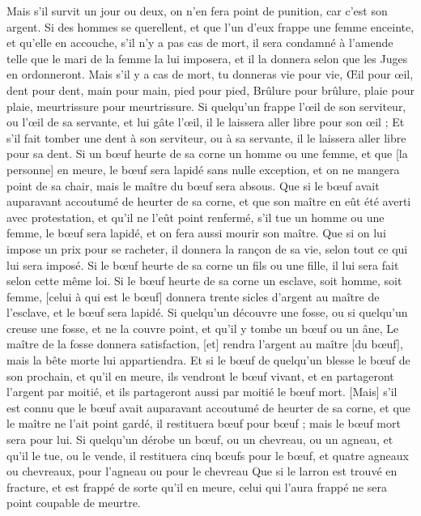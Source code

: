 \begin{multicols}{2}
Mais s'il survit un jour ou deux, on n'en fera point de punition, car c'est son argent.
Si des hommes se querellent, et que l'un d'eux frappe une femme enceinte, et qu'elle en accouche, s'il n'y a pas cas de mort, il sera condamné à l'amende telle que le mari de la femme la lui imposera, et il la donnera selon que les Juges en ordonneront.
Mais s'il y a cas de mort, tu donneras vie pour vie,
Œil pour œil, dent pour dent, main pour main, pied pour pied,
Brûlure pour brûlure, plaie pour plaie, meurtrissure pour meurtrissure.
Si quelqu'un frappe l'œil de son serviteur, ou l'œil de sa servante, et lui gâte l'œil, il le laissera aller libre pour son œil ;
Et s'il fait tomber une dent à son serviteur, ou à sa servante, il le laissera aller libre pour sa dent.
Si un bœuf heurte de sa corne un homme ou une femme, et que [la personne] en meure, le bœuf sera lapidé sans nulle exception, et on ne mangera point de sa chair, mais le maître du bœuf sera absous.
Que si le bœuf avait auparavant accoutumé de heurter de sa corne, et que son maître en eût été averti avec protestation, et qu'il ne l'eût point renfermé, s'il tue un homme ou une femme, le bœuf sera lapidé, et on fera aussi mourir son maître.
Que si on lui impose un prix pour se racheter, il donnera la rançon de sa vie, selon tout ce qui lui sera imposé.
Si le bœuf heurte de sa corne un fils ou une fille, il lui sera fait selon cette même loi.
Si le bœuf heurte de sa corne un esclave, soit homme, soit femme, [celui à qui est le bœuf] donnera trente sicles d'argent au maître de l'esclave, et le bœuf sera lapidé.
Si quelqu'un découvre une fosse, ou si quelqu'un creuse une fosse, et ne la couvre point, et qu'il y tombe un bœuf ou un âne,
Le maître de la fosse donnera satisfaction, [et] rendra l'argent au maître [du bœuf], mais la bête morte lui appartiendra.
Et si le bœuf de quelqu'un blesse le bœuf de son prochain, et qu'il en meure, ils vendront le bœuf vivant, et en partageront l'argent par moitié, et ils partageront aussi par moitié le bœuf mort.
[Mais] s'il est connu que le bœuf avait auparavant accoutumé de heurter de sa corne, et que le maître ne l'ait point gardé, il restituera bœuf pour bœuf ; mais le bœuf mort sera pour lui.
\VerseOne{}Si quelqu'un dérobe un bœuf, ou un chevreau, ou un agneau, et qu'il le tue, ou le vende, il restituera cinq bœufs pour le bœuf, et quatre agneaux ou chevreaux, pour l'agneau ou pour le chevreau
Que si le larron est trouvé en fracture, et est frappé de sorte qu'il en meure, celui qui l'aura frappé ne sera point coupable de meurtre.

\end{multicols}
